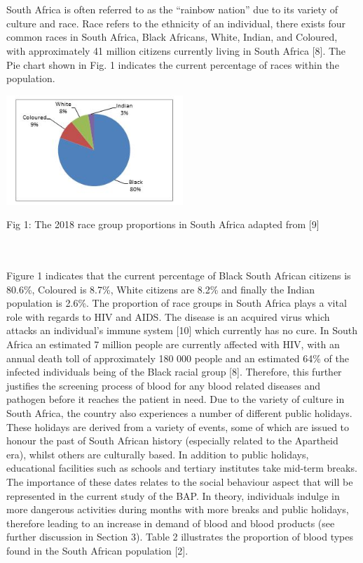 \documentclass{article}
\begin{document}
\\
\\
South Africa is often referred to as the “rainbow nation” due to its variety of culture and race. Race refers to the ethnicity of an individual, there exists four common races in South Africa, Black Africans, White, Indian, and Coloured, with approximately 41 million citizens currently living in South Africa [8]. The Pie chart shown in Fig. 1 indicates the current percentage of races within the population.


\includegraphics[width=0.5\textwidth, center]{Images/PieNew.JPG}
\begin {center}
Fig 1: The 2018 race group proportions in South Africa adapted from [9]
\end {center}
\\
\\
Figure 1 indicates that the current percentage of Black South African citizens is 80.6\%, Coloured is 8.7\%, White citizens are 8.2\% and finally the Indian population is 2.6\%. The proportion of race groups in South Africa plays a vital role with regards to HIV and AIDS. The disease is an acquired virus which attacks an individual’s immune system [10] which currently has no cure. In South Africa an estimated 7 million people are currently affected with HIV, with an annual death toll of approximately 180 000 people and an estimated 64\% of the infected individuals being of the Black racial group [8]. Therefore, this further justifies the screening process of blood for any blood related diseases and pathogen before it reaches the patient in need. Due to the variety of culture in South Africa, the country also experiences a number of different public holidays. These holidays are derived from a variety of events, some of which are issued to honour the past of South African history (especially related to the Apartheid era), whilst others are culturally based. In addition to public holidays, educational facilities such as schools and tertiary institutes take mid-term breaks. The importance of these dates relates to the social behaviour aspect that will be represented in the current study of the BAP. In theory, individuals indulge in more dangerous activities during months with more breaks and public holidays, therefore leading to an increase in demand of blood and blood products (see further discussion in Section 3). Table 2 illustrates the proportion of blood types found in the South African population [2].
\end{document}
